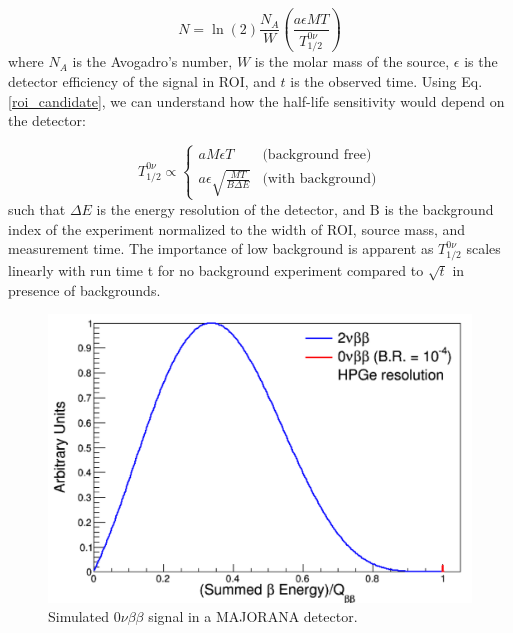 \begin{equation}\label{roi_candidate}
N=\ln(2)\frac{N_A}{W}\left(\frac{a\epsilon MT}{T^{0\nu}_{1/2}}\right)
\end{equation}
where $N_A$ is the Avogadro's number, $W$ is the molar mass of the source, $\epsilon$ is the detector efficiency of the signal in ROI, and $t$ is the observed time. Using Eq. \ref{roi_candidate}, we can understand how the half-life sensitivity would depend on the detector:

\begin{equation}\label{det_sensitivity}
T^{0\nu}_{1/2} \propto
    \begin{cases}
    aM\epsilon T & \text{(background free)}\\
    a\epsilon\sqrt{\frac{MT}{B\Delta E}} & \text{(with background)}
    \end{cases}       
\end{equation}
such that $\Delta E$ is the energy resolution of the detector, and B is the background index of the experiment normalized to the width of ROI, source mass, and measurement time. The importance of low background is apparent as $T^{0\nu}_{1/2}$ scales linearly with run time t for no background experiment compared to $\sqrt{t}$ in presence of backgrounds.


\begin{figure}
\centering
\includegraphics[scale=0.5]{ch1/figs/DoubleBetaEnergy.png}
\caption{Simulated $0\nu\beta\beta$ signal in a MAJORANA detector. \cite{mjd_background}}
\label{mjd_background_fig}
\end{figure}

